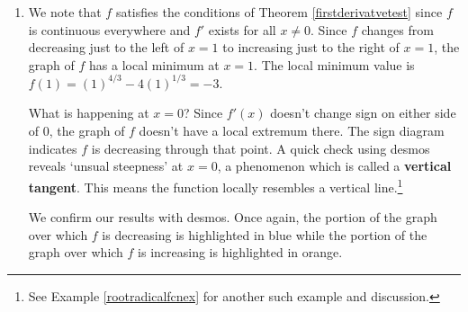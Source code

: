 \documentclass{ximera}
\begin{document}
\begin{example}
\begin{explanation}
\begin{enumerate}
Using  Theorem \ref{firstderivatveandgraphs}, we get:

\begin{image}
\end{image}

We get $f$ is decreasing for $x<0$ as well as from $0 < x < 1$.  Since $0$ is in the domain of $f$, we splice the two intervals together so $f$ is decreasing from $(-\infty, 1)$.  We see $f$ is increasing from $(1, \infty)$.



\item   We note that $f$ satisfies the conditions of Theorem \ref{firstderivatvetest} since $f$ is continuous everywhere and $f'$ exists for all $x \neq 0$.  Since $f$ changes from decreasing just to the left of $x=1$ to increasing just to the right of $x=1$,  the graph of $f$ has a local minimum at $x=1$.  The local minimum value is $f(1) = (1)^{4/3} - 4(1)^{1/3} = -3$. 

What is happening at $x = 0$?  Since $f'(x)$ doesn't change sign on either side of $0$,  the graph of $f$ doesn't have a local extremum there.  The sign diagram indicates  $f$ is decreasing through that point.  A quick check using desmos reveals `unsual steepness' at $x = 0$, a phenomenon which is called a \textbf{vertical tangent}. This means the function locally resembles a vertical line.\footnote{See Example \ref{rootradicalfcnex} for another such example and discussion.}

We confirm our results with desmos.  Once again, the portion of the graph over which $f$ is decreasing is highlighted in blue while the portion of the graph over which $f$ is increasing is highlighted in orange.

\begin{center}
\end{center}

\end{enumerate}

\end{explanation}

\end{example}
\end{document}
